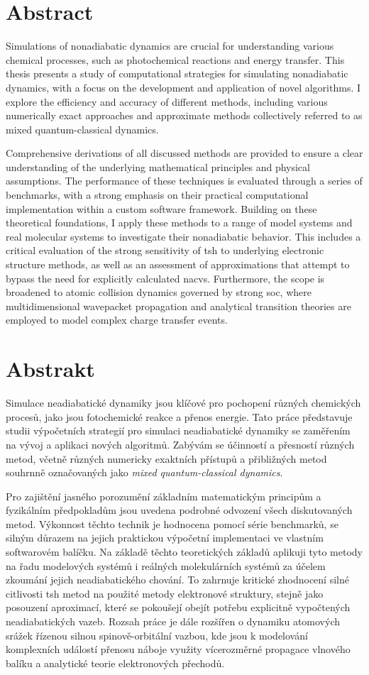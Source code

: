 \chapter*{Abstract}
Simulations of nonadiabatic dynamics are crucial for understanding various chemical processes, such as photochemical reactions and energy transfer. This thesis presents a study of computational strategies for simulating nonadiabatic dynamics, with a focus on the development and application of novel algorithms. I explore the efficiency and accuracy of different methods, including various numerically exact approaches and approximate methods collectively referred to as mixed quantum-classical dynamics.

Comprehensive derivations of all discussed methods are provided to ensure a clear understanding of the underlying mathematical principles and physical assumptions. The performance of these techniques is evaluated through a series of benchmarks, with a strong emphasis on their practical computational implementation within a custom software framework. Building on these theoretical foundations, I apply these methods to a range of model systems and real molecular systems to investigate their nonadiabatic behavior. This includes a critical evaluation of the strong sensitivity of \gls{tsh} to underlying electronic structure methods, as well as an assessment of approximations that attempt to bypass the need for explicitly calculated \glspl{nacv}. Furthermore, the scope is broadened to atomic collision dynamics governed by strong \gls{soc}, where multidimensional wavepacket propagation and analytical transition theories are employed to model complex charge transfer events.
\chapter*{Abstrakt}
Simulace neadiabatické dynamiky jsou klíčové pro pochopení různých chemických procesů, jako jsou fotochemické reakce a přenos energie. Tato práce představuje studii výpočetních strategií pro simulaci neadiabatické dynamiky se zaměřením na vývoj a aplikaci nových algoritmů. Zabývám se účinností a přesností různých metod, včetně různých numericky exaktních přístupů a přibližných metod souhrnně označovaných jako \textit{mixed quantum-classical dynamics}.

Pro zajištění jasného porozumění základním matematickým principům a fyzikálním předpokladům jsou uvedena podrobné odvození všech diskutovaných metod. Výkonnost těchto technik je hodnocena pomocí série benchmarků, se silným důrazem na jejich praktickou výpočetní implementaci ve vlastním softwarovém balíčku. Na základě těchto teoretických základů aplikuji tyto metody na řadu modelových systémů i reálných molekulárních systémů za účelem zkoumání jejich neadiabatického chování. To zahrnuje kritické zhodnocení silné citlivosti \gls{tsh} metod na použité metody elektronové struktury, stejně jako posouzení aproximací, které se pokoušejí obejít potřebu explicitně vypočtených neadiabatických vazeb. Rozsah práce je dále rozšířen o dynamiku atomových srážek řízenou silnou spinově-orbitální vazbou, kde jsou k modelování komplexních událostí přenosu náboje využity vícerozměrné propagace vlnového balíku a analytické teorie elektronových přechodů.
